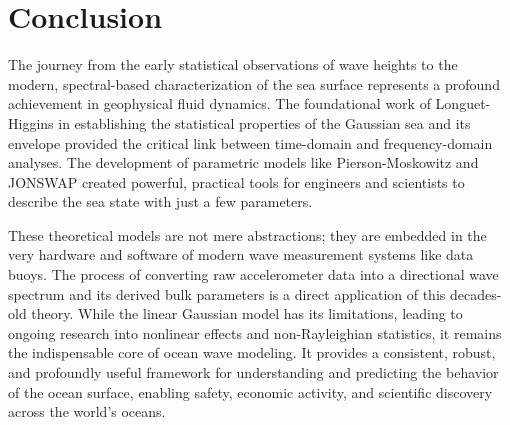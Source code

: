 \documentclass[12pt]{article}
\begin{document}
\section{Conclusion}
The journey from the early statistical observations of wave heights to the modern, spectral-based characterization of the sea surface represents a profound achievement in geophysical fluid dynamics. The foundational work of Longuet-Higgins in establishing the statistical properties of the Gaussian sea and its envelope provided the critical link between time-domain and frequency-domain analyses. The development of parametric models like Pierson-Moskowitz and JONSWAP created powerful, practical tools for engineers and scientists to describe the sea state with just a few parameters.

These theoretical models are not mere abstractions; they are embedded in the very hardware and software of modern wave measurement systems like data buoys. The process of converting raw accelerometer data into a directional wave spectrum and its derived bulk parameters is a direct application of this decades-old theory. While the linear Gaussian model has its limitations, leading to ongoing research into nonlinear effects and non-Rayleighian statistics, it remains the indispensable core of ocean wave modeling. It provides a consistent, robust, and profoundly useful framework for understanding and predicting the behavior of the ocean surface, enabling safety, economic activity, and scientific discovery across the world's oceans.
\end{document}
